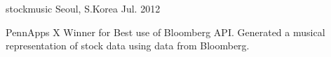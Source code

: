 

\begin{cventries}

  \cventry
    {} %
    {stockmusic} %
    {Seoul, S.Korea} %
    {Jul. 2012} %
    {
      \begin{cvitems} %
        \item {PennApps X Winner for Best use of Bloomberg API. Generated a musical representation of stock data using data from Bloomberg.}
      \end{cvitems}
    }

\end{cventries}
